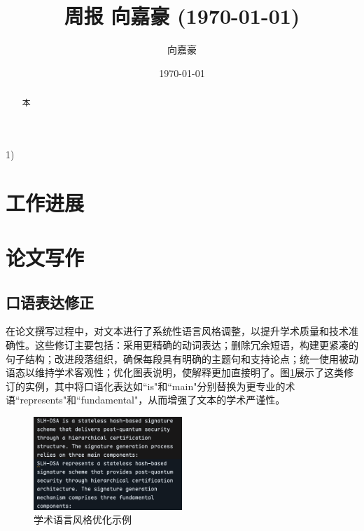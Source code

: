 \documentclass{article}
\title{周报 向嘉豪 (\today)}
\author{向嘉豪}
\date{\today}
\begin{document}
\maketitle

\begin{abstract}
  本
\end{abstract}

\begin{weekplan}
1)
\end{weekplan}

\section{工作进展}


\section{论文写作}

\subsection{口语表达修正}

在论文撰写过程中，对文本进行了系统性语言风格调整，以提升学术质量和技术准确性。这些修订主要包括：采用更精确的动词表达；删除冗余短语，构建更紧凑的句子结构；改进段落组织，确保每段具有明确的主题句和支持论点；统一使用被动语态以维持学术客观性；优化图表说明，使解释更加直接明了。图\ref{fig:example}展示了这类修订的实例，其中将口语化表达如``is"和``main"分别替换为更专业的术语``represents"和``fundamental"，从而增强了文本的学术严谨性。

\begin{figure}[htbp]
\centering
\includegraphics[width=0.5\textwidth]{./fig/fix_writing.png}
\caption{学术语言风格优化示例}
\label{fig:example}
\end{figure}

\end{document}
